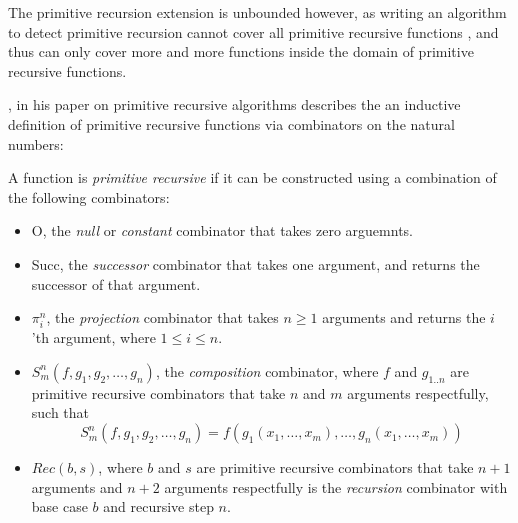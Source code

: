 The primitive recursion extension is unbounded however, as writing an algorithm to detect primitive
recursion cannot cover all primitive recursive functions , and thus can only cover more and more
functions inside the domain of primitive recursive functions.

\citet{AboutPrimrecAlgorithms}, in his paper on primitive recursive algorithms describes the
an inductive definition of primitive recursive functions via combinators on the natural numbers:

\theoremstyle{definition}
\begin{definition}
    \label{def:primrec}
    A function is \textit{primitive recursive} if it can be constructed using 
    a combination of the following combinators:

    \begin{itemize}
        \item 
            \textsf{O}, the \textit{null} or \textit{constant} combinator that takes zero arguemnts.
        \item 
            \textsf{Succ}, the \textit{successor} combinator that takes one argument, and returns the successor
            of that argument.
        \item 
            \textsf{$\pi^n_i$}, the \textit{projection} combinator that takes $n \geq 1$ arguments and returns
            the $i$'th argument, where $1 \leq i \leq n$.
        \item 
            \textsf{$S^n_m(f, g_1, g_2, \dots, g_n)$}, the \textit{composition} combinator, where $f$ and $g_{1..n}$ are 
            primitive recursive combinators that take $n$ and $m$ arguments respectfully, such that 
                $$S^n_m(f, g_1, g_2, \dots, g_n) = f(g_1(x_1, \dots, x_m), \dots, g_n(x_1, \dots, x_m))$$
        \item 
            \textsf{$Rec(b,s)$}, where $b$ and $s$ are primitive recursive combinators that take
            $n + 1$ arguments and $n + 2$ arguments respectfully is the \textit{recursion}
            combinator with base case $b$ and recursive step $n$.
    \end{itemize}
\end{definition}


